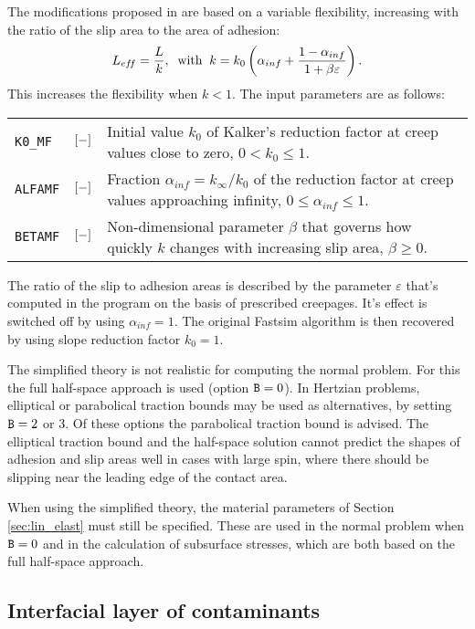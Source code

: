 \documentclass[12pt]{report}
\newenvironment{inputvars}{\vspace{0.4\baselineskip}%

\begin{tabular}{>{\raggedright}p{22mm}p{19mm}p{113mm}}}{
\end{tabular}

}
\newcommand{\inpvar}[3]{{\small\tt #1} & $#2$ & #3 \\[1ex]}
\begin{document}
The modifications proposed in \cite{Spiryagin2013} are based on a variable
flexibility, increasing with the ratio of the slip area to the area
of adhesion:
\begin{equation}
   L_{ef\!f} = \frac{L}{k}, \;\;\mbox{with}\;\;
   k = k_0 \left( \alpha_{inf} + 
                \frac{1-\alpha_{inf}}{1+\beta\varepsilon} \right) .
\end{equation}
This increases the flexibility when $k<1$. The input parameters are as
follows:
\begin{inputvars}
\inpvar{K0\_MF}{\bunit{-}}{Initial value $k_0$ of Kalker's reduction factor at creep
        values close to zero, $0<k_0\le 1$.}
\inpvar{ALFAMF}{\bunit{-}}{Fraction $\alpha_{inf}=k_\infty/k_0$ of the reduction
        factor at creep values approaching infinity, $0\le\alpha_{inf}\le 1$.}
\inpvar{BETAMF}{\bunit{-}}{Non-dimensional parameter $\beta$ that governs how
        quickly $k$ changes with increasing slip area, $\beta\ge 0$.}
\end{inputvars}
The ratio of the slip to adhesion areas is described by the parameter
$\varepsilon$ that's computed in the program on the basis of prescribed
creepages. It's effect is switched off by using $\alpha_{inf}=1$.
The original Fastsim algorithm is then recovered by using slope reduction
factor $k_0=1$.

The simplified theory is not realistic for computing the normal problem.
For this the full half-space approach is used (option ${\tt B}=0$). In
Hertzian problems, elliptical or parabolical traction bounds may be
used as alternatives, by setting ${\tt B}=2$ or 3. Of these options the
parabolical traction bound is advised. The elliptical traction bound and
the half-space solution cannot predict the shapes of adhesion and slip
areas well in cases with large spin, where there should be slipping near
the leading edge of the contact area.

When using the simplified theory, the material parameters of Section
\ref{sec:lin_elast} must still be specified. These are used in the normal
problem when ${\tt B}=0$ and in the calculation of subsurface stresses,
which are both based on the full half-space approach.

\subsection{Interfacial layer of contaminants}
\label{sec:intfc_layer}
\end{document}
